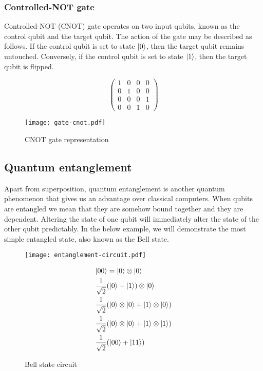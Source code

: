 \subsubsection*{Controlled-NOT gate} 
Controlled-NOT (CNOT) gate operates on two input qubits, known as the control qubit and the target qubit. The action of the gate may be described as follows. If the control qubit is set to state $\lvert0\rangle$, then the target qubit remains untouched. Conversely, if the control qubit is set to state $\lvert1\rangle$, then the target qubit is flipped.

\begin{figure}[H]
  \centering
  \begin{minipage}[c]{0.4\linewidth}
    \centering
    $$\begin{pmatrix}
      1 & 0 & 0 & 0 \\
      0 & 1 & 0 & 0 \\
      0 & 0 & 0 & 1 \\
      0 & 0 & 1 & 0
  \end{pmatrix}$$
  \end{minipage}
  \begin{minipage}[c]{0.25\linewidth}
    \centering
    \texttt{[image: gate-cnot.pdf]}
  \end{minipage}
  \caption{CNOT gate representation}
\end{figure}

\subsection*{Quantum entanglement}
Apart from superposition, quantum entanglement is another quantum phenomenon that gives us an advantage over classical computers. When qubits are entangled we mean that they are somehow bound together and they are dependent. Altering the state of one qubit will immediately alter the state of the other qubit predictably. In the below example, we will demonstrate the most simple entangled state, also known as the Bell state.

\begin{figure}[H]
\begin{minipage}{.5\textwidth}
    \centering
    \texttt{[image: entanglement-circuit.pdf]}
    \caption{Bell state circuit}
\end{minipage}
\begin{minipage}{.5\textwidth}
  \begin{align} 
             &\lvert00\rangle = \lvert0\rangle \otimes \lvert0\rangle \label{eq1} \\
             &\frac{1}{\sqrt{2}}(\lvert0\rangle + \lvert1\rangle) \otimes \lvert0\rangle \label{eq2}\\
             &\frac{1}{\sqrt{2}}(\lvert0\rangle \otimes \lvert0\rangle + \lvert1\rangle \otimes \lvert0\rangle) \label{eq3} \\
             &\frac{1}{\sqrt{2}}(\lvert0\rangle \otimes \lvert0\rangle + \lvert1\rangle \otimes \lvert1\rangle) \label{eq4}\\
             &\frac{1}{\sqrt{2}}(\lvert00\rangle + \lvert11\rangle) \label{eq5}
  \end{align}
\end{minipage}
\end{figure}

